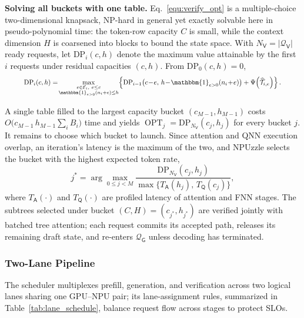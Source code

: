 \documentclass[sigconf,nonacm,10pt]{acmart}
\newcommand{\name}{NPUzzle\xspace}
\begin{document}
\noindent\textbf{Solving all buckets with one table.}
Eq.~\eqref{equ:verify_opt} is a multiple-choice two-dimensional knapsack, NP-hard in general yet exactly solvable here in pseudo-polynomial time:  the token-row capacity $C$ is small, while the context dimension $H$ is coarsened into blocks to bound the state space. With $N_{\mathsf V}=|\mathcal Q_{\mathsf V}|$ ready requests, let $\mathrm{DP}_i(c,h)$ denote the maximum value attainable by the first $i$ requests under residual capacities $(c,h)$. From $\mathrm{DP}_0(c,h)=0$,
\begin{equation}
\resizebox{0.91\linewidth}{!}{$\displaystyle
\mathrm{DP}_i(c,h)=\!
\max_{\substack{e\in\mathcal E_i,\ e\leq c\\
\mathbbm{1}_{e>0}(n_i+e)\leq h}}\!
\left\{
\mathrm{DP}_{i-1}\!\left(c\!-\!e,\,
h\!-\!\mathbbm{1}_{e>0}(n_i\!+\!e)\right)
+\Psi\!\left(\widehat{\mathcal T}_{i,e}\right)
\right\}.
$}
\label{equ:verify_dp}
\end{equation}

A single table filled to the largest capacity bucket $(c_{M-1},h_{M-1})$ costs $O\bigl(c_{M-1}\,h_{M-1}\sum_i B_i\bigr)$ time and yields $\operatorname{OPT}_j=\mathrm{DP}_{N_{\mathsf V}}(c_j,h_j)$ for every bucket $j$. It remains to choose which bucket to launch. Since attention and QNN execution overlap, an iteration's latency is the maximum of the two, and \name selects the bucket with the highest expected token rate,
\begin{equation}
j^*=\arg\max_{0\leq j<M}
\frac{\mathrm{DP}_{N_{\mathsf V}}(c_j,h_j)}
{\max\bigl\{T_{\mathsf A}(h_j),\,T_{\mathsf Q}(c_j)\bigr\}},
\label{equ:verify_bucket}
\end{equation}
where $T_{\mathsf A}(\cdot)$ and $T_{\mathsf Q}(\cdot)$ are profiled latency of attention and FNN stages. The subtrees selected under bucket $(C,H)=(c_{j^*},h_{j^*})$ are verified jointly with batched tree attention; each request commits its accepted path, releases its remaining draft state, and re-enters $\mathcal Q_{\mathsf G}$ unless decoding has terminated.

\subsubsection{Two-Lane Pipeline} \label{sec:pipeline_schedule}
The scheduler multiplexes prefill, generation, and verification across two logical lanes sharing one GPU--NPU pair; its lane-assignment rules, summarized in Table~\ref{tab:lane_schedule}, balance request flow across stages to protect SLOs.
\end{document}
